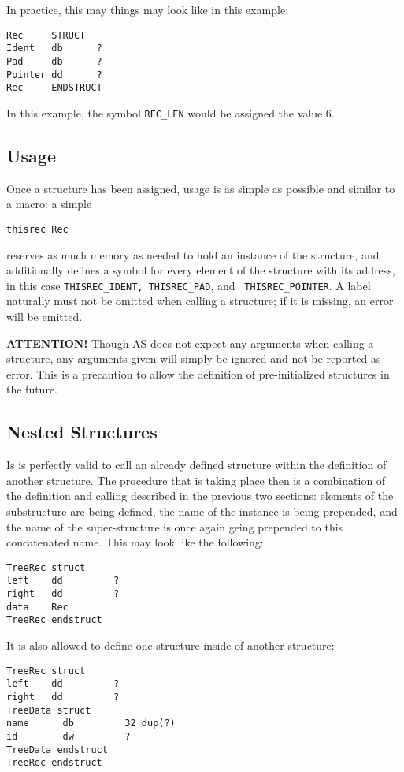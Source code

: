\documentclass[12pt,twoside]{report}
\begin{document}
In practice, this may things may look like in this example:
\begin{verbatim}
Rec     STRUCT
Ident   db      ?
Pad     db      ?
Pointer dd      ?
Rec     ENDSTRUCT
\end{verbatim}
In this example, the symbol {\tt REC\_LEN} would be assigned the value 6.

\subsection{Usage}

Once a structure has been assigned, usage is as simple as possible and
similar to a macro: a simple
\begin{verbatim}
thisrec Rec
\end{verbatim}
reserves as much memory as needed to hold an instance of the structure,
and additionally defines a symbol for every element of the structure with
its address, in this case {\tt THISREC\_IDENT, THISREC\_PAD}, and {\tt
THISREC\_POINTER}.  A label naturally must not be omitted when calling a
structure; if it is missing, an error will be emitted.

{\bf ATTENTION!} Though AS does not expect any arguments when calling a
structure, any arguments given will simply be ignored and not be reported
as error.  This is a precaution to allow the definition of pre-initialized
structures in the future.

\subsection{Nested Structures}

Is is perfectly valid to call an already defined structure within the
definition of another structure.  The procedure that is taking place then
is a combination of the definition and calling described in the previous
two sections: elements of the substructure are being defined, the name of
the instance is being prepended, and the name of the super-structure is
once again geing prepended to this concatenated name.  This may look like
the following:
\begin{verbatim}
TreeRec struct
left    dd         ?
right   dd         ?
data    Rec
TreeRec endstruct
\end{verbatim}

It is also allowed to define one structure inside of another
structure:
\begin{verbatim}
TreeRec struct
left    dd         ?
right   dd         ?
TreeData struct
name      db         32 dup(?)
id        dw         ?
TreeData endstruct
TreeRec endstruct
\end{verbatim}
\end{document}
